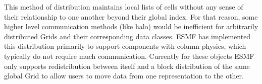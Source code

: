 This method of distribution maintains local lists of cells without any sense
of their relationship to one another beyond their global index.  For that
reason, some higher level communication methods (like halo) would be 
inefficient for arbitrarily distributed Grids and their corresponding data
classes.  ESMF has implemented this distribution primarily to support 
components with column physics, which typically do not require much 
communication.  Currently for these objects ESMF only supports redistribution
between itself and a block distribution of the same global Grid to allow users
to move data from one representation to the other.
